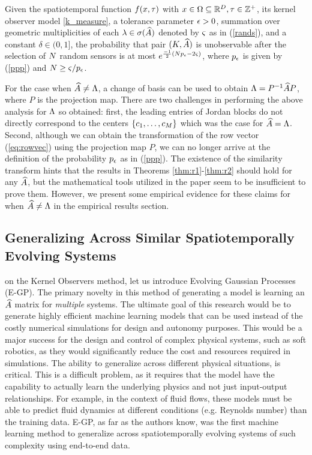 \begin{theorem}\label{thm:r2}
	Given the spatiotemporal function $ f(x,\tau) $ with $ x \in \Omega \subseteq  \mathbb{R}^{D}, \tau\in \mathbb{Z}^+  $, its kernel observer model \eqref{k_measure}, a tolerance parameter $\epsilon>0$, summation over geometric multiplicities of each $ \lambda \in \sigma(\widehat{A}) $ denoted by $ \varsigma  $ as in  (\ref{rands}), and a constant $ \delta \in (0,1] $, the probability that pair $ (K, \widehat{A}) $ is unobservable after the selection of $ N $ random sensors is at most $ e^{\frac{-1}{2}(N p_{\epsilon}-2\varsigma)} $, where $ p_{\epsilon} $ is given by (\ref{ppp}) and $ N \geq \varsigma/p_{\epsilon} $.
\end{theorem}
For the case when $ \widehat{A} \neq \Lambda $, a change of basis can be used to obtain $ \Lambda = P^{-1}\widehat{A} P $, where $ P $ is the projection map. There are two challenges in performing the above analysis for $\Lambda$ so obtained: first, the leading entries of Jordan blocks do not directly correspond to the centers $\{ c_1,\dots,c_M\}$ which was the case for $ \widehat{A} = \Lambda $. Second, although we can obtain the transformation of the row vector (\ref{eq:rowvec}) using the projection map $P$, we can no longer arrive at the definition of the probability $p_{\epsilon}$ as in  (\ref{ppp}). The existence of the similarity transform hints that the results in Theorems \ref{thm:r1}-\ref{thm:r2} should hold for any $ \widehat{A}$, but the mathematical tools utilized in the paper seem to be insufficient to prove them. However, we present some empirical evidence for these claims for when $ \widehat{A} \neq \Lambda $  in the empirical results section.%


\subsection{Generalizing Across Similar Spatiotemporally Evolving Systems} \label{sec:egp}
\Building on the Kernel Observers method, let us introduce Evolving Gaussian Processes (E-GP). The primary novelty in this method of generating a model is learning an $\widehat{A}$ matrix for \emph{multiple} systems. The ultimate goal of this research would be to generate highly efficient machine learning models that can be used instead of the costly numerical simulations for design and autonomy purposes. This would be a major success for the design and control of complex physical systems, such as soft robotics, as they would significantly reduce the cost and resources required in simulations. The ability to generalize across different physical situations, is critical. This is a difficult problem, as it requires that the model have the capability to actually learn the underlying physics and not just input-output relationships. For example, in the context of fluid flows, these models must be able to predict fluid dynamics at different conditions (e.g. Reynolds number) than the training data. E-GP, as far as the authors know, was the first machine learning method to generalize across spatiotemporally evolving systems of such complexity using end-to-end data.

